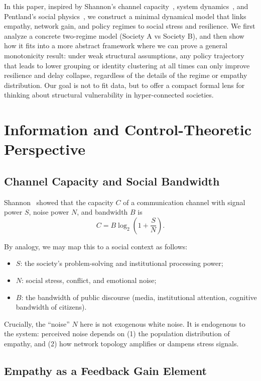 \documentclass[11pt]{article}
\theoremstyle{plain}
\begin{document}
In this paper, inspired by Shannon's channel capacity~\cite{shannon1948}, system dynamics~\cite{forrester1961,forrester1971}, and Pentland's social physics~\cite{pentland2014}, we construct a minimal dynamical model that links empathy, network gain, and policy regimes to social stress and resilience.
We first analyze a concrete two-regime model (Society A vs Society B), and then show how it fits into a more abstract framework where we can prove a general monotonicity result:
under weak structural assumptions, any policy trajectory that leads to lower grouping or identity clustering at all times can only improve resilience and delay collapse, regardless of the details of the regime or empathy distribution.
Our goal is not to fit data, but to offer a compact formal lens for thinking about structural vulnerability in hyper-connected societies.

\section{Information and Control-Theoretic Perspective}

\subsection{Channel Capacity and Social Bandwidth}

Shannon~\cite{shannon1948} showed that the capacity $C$ of a communication channel with signal power $S$, noise power $N$, and bandwidth $B$ is
\begin{equation}
C = B \log_2\left(1 + \frac{S}{N}\right).
\end{equation}

By analogy, we may map this to a social context as follows:
\begin{itemize}
  \item $S$: the society's problem-solving and institutional processing power;
  \item $N$: social stress, conflict, and emotional noise;
  \item $B$: the bandwidth of public discourse (media, institutional attention, cognitive bandwidth of citizens).
\end{itemize}

Crucially, the ``noise'' $N$ here is not exogenous white noise.
It is endogenous to the system: perceived noise depends on (1) the population distribution of empathy, and (2) how network topology amplifies or dampens stress signals.

\subsection{Empathy as a Feedback Gain Element}
\end{document}
